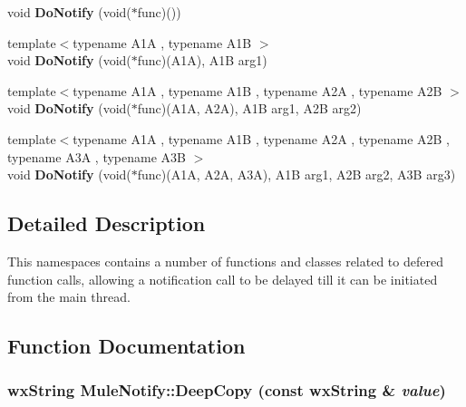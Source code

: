 \begin{Indent}{\bf }\par
{\em \label{_amgrpd41d8cd98f00b204e9800998ecf8427e}
 }\begin{DoxyCompactItemize}
\item 
void {\bf DoNotify} (void($\ast$func)())
\item 
{\footnotesize template$<$typename A1A , typename A1B $>$ }\\void {\bfseries DoNotify} (void($\ast$func)(A1A), A1B arg1)\label{namespaceMuleNotify_af72e00db907f4a109ac9261a329b384e}

\item 
{\footnotesize template$<$typename A1A , typename A1B , typename A2A , typename A2B $>$ }\\void {\bfseries DoNotify} (void($\ast$func)(A1A, A2A), A1B arg1, A2B arg2)\label{namespaceMuleNotify_acd7690c9337c179a67ab748e32d2c2d5}

\item 
{\footnotesize template$<$typename A1A , typename A1B , typename A2A , typename A2B , typename A3A , typename A3B $>$ }\\void {\bfseries DoNotify} (void($\ast$func)(A1A, A2A, A3A), A1B arg1, A2B arg2, A3B arg3)\label{namespaceMuleNotify_a3cab9262e92059800a76d6baa3bc4123}

\end{DoxyCompactItemize}
\end{Indent}


\subsection{Detailed Description}
This namespaces contains a number of functions and classes related to defered function calls, allowing a notification call to be delayed till it can be initiated from the main thread. 

\subsection{Function Documentation}
\subsubsection[{DeepCopy}]{\setlength{\rightskip}{0pt plus 5cm}wxString MuleNotify::DeepCopy (const wxString \& {\em value})\hspace{0.3cm}{\ttfamily  [inline]}}\label{namespaceMuleNotify_a09d3e83712f2ef6e0b85e434cb211703}


